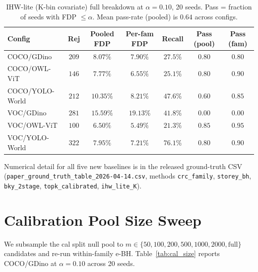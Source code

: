 \documentclass{article}
\theoremstyle{remark}
\newcommand{\1}{\mathbf{1}}
\begin{document}
\begin{table}[h]
\centering
\small
\begin{tabular*}{\linewidth}{@{\extracolsep{\fill}}lcccccc@{}}
\toprule
Config & Rej & Pooled FDP & Per-fam FDP & Recall & Pass (pool) & Pass (fam) \\
\midrule
COCO/GDino       & $209$ & $8.07\%$  & $7.90\%$  & $27.5\%$ & $0.80$ & $0.80$ \\
COCO/OWL-ViT     & $146$ & $7.77\%$  & $6.55\%$  & $25.1\%$ & $0.80$ & $0.90$ \\
COCO/YOLO-World  & $212$ & $10.35\%$ & $8.21\%$  & $47.6\%$ & $0.60$ & $0.85$ \\
VOC/GDino        & $281$ & $15.59\%$ & $19.13\%$ & $41.8\%$ & $0.00$ & $0.00$ \\
VOC/OWL-ViT      & $100$ & $6.50\%$  & $5.49\%$  & $21.3\%$ & $0.85$ & $0.95$ \\
VOC/YOLO-World   & $322$ & $7.95\%$  & $7.21\%$  & $76.1\%$ & $0.80$ & $0.90$ \\
\bottomrule
\end{tabular*}
\caption{IHW-lite (K-bin covariate) full breakdown at $\alpha=0.10$,
20 seeds. Pass = fraction of seeds with FDP $\le\alpha$.
Mean pass-rate (pooled) is $0.64$ across configs.}
\label{tab:ihw_lite_full}
\end{table}

Numerical detail for all five new baselines is in the released
ground-truth CSV (\texttt{paper\_ground\_truth\_table\_2026-04-14.csv},
methods \texttt{crc\_family}, \texttt{storey\_bh}, \texttt{bky\_2stage},
\texttt{topk\_calibrated}, \texttt{ihw\_lite\_K}).

\section{Calibration Pool Size Sweep}
\label{app:cal_size_sweep}

We subsample the cal split null pool to $m \in \{50, 100, 200, 500,
1000, 2000, \text{full}\}$ candidates and re-run within-family e-BH.
Table~\ref{tab:cal_size} reports COCO/GDino at $\alpha\!=\!0.10$
across 20 seeds.
\end{document}

